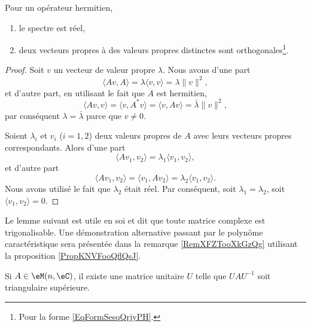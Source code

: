 \begin{lemma}
    Pour un opérateur hermitien,
    \begin{enumerate}
        \item
            le spectre est réel,
        \item
            deux vecteurs propres à des valeurs propres distinctes sont orthogonales\footnote{Pour la forme \eqref{EqFormSesqQrjyPH}.}.
    \end{enumerate}
\end{lemma}

\begin{proof}
    Soit \( v\) un vecteur de valeur propre \( \lambda\). Nous avons d'une part 
    \begin{equation}
        \langle Av, A\rangle =\lambda\langle v, v\rangle =\lambda\| v \|^2,
    \end{equation}
    et d'autre part, en utilisant le fait que \( A\) est hermitien,
    \begin{equation}
        \langle Av, v\rangle =\langle v, A^*v\rangle =\langle v, Av\rangle =\bar\lambda\| v \|^2,
    \end{equation}
    par conséquent \( \lambda=\bar\lambda\) parce que \( v\neq 0\).

    Soient \( \lambda_i\) et \( v_i\) (\( i=1,2\)) deux valeurs propres de \( A\) avec leurs vecteurs propres correspondants. Alors d'une part
    \begin{equation}
        \langle Av_1, v_2\rangle =\lambda_1\langle v_1, v_2\rangle ,
    \end{equation}
    et d'autre part
    \begin{equation}
        \langle Av_1, v_2\rangle =\langle v_1, Av_2\rangle =\lambda_2\langle v_1, v_2\rangle .
    \end{equation}
    Nous avons utilisé le fait que \( \lambda_2\) était réel. Par conséquent, soit \( \lambda_1=\lambda_2\), soit \( \langle v_1, v_2\rangle =0\).
\end{proof}

Le lemme suivant est utile en soi et dit que toute matrice complexe est trigonalisable. Une démonstration alternative passant par le polynôme caractéristique sera présentée dans la remarque \ref{RemXFZTooXkGzQg} utilisant la proposition \ref{PropKNVFooQflQsJ}.
\begin{lemma}  \label{LemSchurComplHAftTq}
    Si \( A\in\eM(n,\eC)\), il existe une matrice unitaire \( U\) telle que \( UAU^{-1}\) soit triangulaire supérieure.
\end{lemma}

